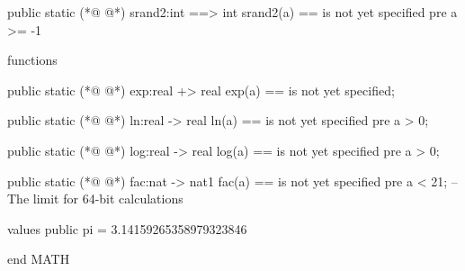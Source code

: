 \begin{vdmpp}[breaklines=true]
public static
(*@
\label{srand2:87}
@*)
    srand2:int ==> int 
    srand2(a) ==
    is not yet specified
    pre a >= -1

  functions

public static
(*@
\label{exp:95}
@*)
    exp:real +> real
    exp(a) ==
    is not yet specified;

public static
(*@
\label{ln:100}
@*)
    ln:real -> real
    ln(a) ==
    is not yet specified
    pre a > 0;

public static
(*@
\label{log:106}
@*)
    log:real -> real
    log(a) ==
    is not yet specified
    pre a > 0;

public static 
(*@
\label{fac:112}
@*)
    fac:nat -> nat1 
    fac(a) == 
    is not yet specified 
    pre a < 21;         -- The limit for 64-bit calculations

  values
public
    pi = 3.14159265358979323846

 
end MATH
\end{vdmpp}
